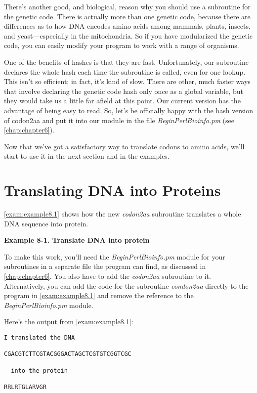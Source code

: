 There's another good, and biological, reason why you should use a subroutine for the genetic code. There is actually more than one genetic code, because there are differences as to how DNA encodes amino acids among mammals, plants, insects, and yeast—especially in the mitochondria. So if you have modularized the genetic code, you can easily modify your program to work with a range of organisms.

One of the benefits of hashes is that they are fast. Unfortunately, our subroutine declares the whole hash each time the subroutine is called, even for one lookup. This isn't so efficient; in fact, it's kind of slow. There are other, much faster ways that involve declaring the genetic code hash only once as a global variable, but they would take us a little far afield at this point. Our current version has the advantage of being easy to read. So, let's be officially happy with the hash version of codon2aa and put it into our module in the file \textit{BeginPerlBioinfo.pm} (see \autoref{chap:chapter6}).

Now that we've got a satisfactory way to translate codons to amino acids, we'll start to use it in the next section and in the examples. 

\section{Translating DNA into Proteins}
\autoref{exam:example8.1} shows how the new \textit{codon2aa} subroutine translates a whole DNA sequence into protein. 

\textbf{Example 8-1. Translate DNA into protein }


To make this work, you'll need the \textit{BeginPerlBioinfo.pm} module for your subroutines in a separate file the program can find, as discussed in \autoref{chap:chapter6}. You also have to add the \textit{codon2aa} subroutine to it.  Alternatively, you can add the code for the subroutine \textit{condon2aa} directly to the program in \autoref{exam:example8.1} and remove the reference to the \textit{BeginPerlBioinfo.pm} module.

Here's the output from \autoref{exam:example8.1}:

\begin{lstlisting}
I translated the DNA

CGACGTCTTCGTACGGGACTAGCTCGTGTCGGTCGC

  into the protein

RRLRTGLARVGR
\end{lstlisting}

